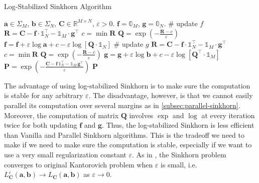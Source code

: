\begin{algorithm}[H]
  \caption{Log-Stabilized Sinkhorn Algorithm}
  \begin{algorithmic}[1]\label{algo:log-sinkhorn}
    \Require $\mathbf{a} \in \Sigma_M$, $\mathbf{b} \in \Sigma_N$, $\mathbf{C} \in \mathbb{R}^{M\times N}$, $\varepsilon > 0$.
    \Initialize $\mathbf{f} = \mathbb{0}_M$, $\mathbf{g} = \mathbb{0}_N$.
    \State \# update $f$
    \State $\mathbf{R} = \mathbf{C} - \mathbf{f}\cdot \mathbb{1}_N^\top - \mathbb{1}_M\cdot \mathbf{g}^\top$
    \State $c = \min \mathbf{R}$
    \State $\mathbf{Q} = \exp \left(
      -\frac{\mathbf{R} - c}{\varepsilon}
      \right)$
    \State $\mathbf{f} = \mathbf{f} + \varepsilon\log \mathbf{a} + c
      - \varepsilon\log \left[
        \mathbf{Q} \cdot\mathbb{1}_N
        \right]$
    \State \# update $g$
    \State $\mathbf{R} = \mathbf{C} - \mathbf{f}\cdot \mathbb{1}_N^\top - \mathbb{1}_M\cdot \mathbf{g}^\top$
    \State $c = \min \mathbf{R}$
    \State $\mathbf{Q} = \exp \left(
      -\frac{\mathbf{R} - c}{\varepsilon}
      \right)$
    \State $\mathbf{g} = \mathbf{g} + \varepsilon \log\mathbf{b} + c
      -\varepsilon\log \left[
        \mathbf{Q}^\top
        \cdot \mathbb{1}_M
        \right]$
    \EndWhile
    \State $\mathbf{P} = \exp \left(
      - \frac{\mathbf{C} - \mathbf{f}\,\mathbb{1}_N^\top - \mathbb{1}_M\,\mathbf{g}^\top}{\varepsilon}
      \right)$
    \Ensure $\mathbf{P}$
  \end{algorithmic}
\end{algorithm}

\begin{remark}[]
  The advantage of using log-stabilized Sinkhorn is to make sure the computation is stable for any arbitrary $\varepsilon$.
  The disadvantage, however, is that we cannot easily parallel its computation over several margins as in
  \cref{subsec:parallel-sinkhorn}.
  Moreover, the computation of matrix $\mathbf{Q}$ involves $\exp$ and $\log$ at every iteration twice
  for both updating $\mathbf{f}$ and $\mathbf{g}$.
  Thus, the log-stabilized Sinkhorn is less efficient than Vanilla and Parallel Sinkhorn algorithms.
  This is the tradeoff we need to make if we need to make sure the computation is stable,
  especially if we want to use a very small regularization constant $\varepsilon$.
  As in \citet[Chapter 4.1]{peyre2019},
  the Sinkhorn problem converges to original Kantorovich problem when $\varepsilon$ is small,
  i.e. $L_{\mathbf{C}}^\varepsilon(\mathbf{a},\mathbf{b}) \to L_{\mathbf{C}}(\mathbf{a},\mathbf{b})$
  as $\varepsilon \to 0$.
\end{remark}

